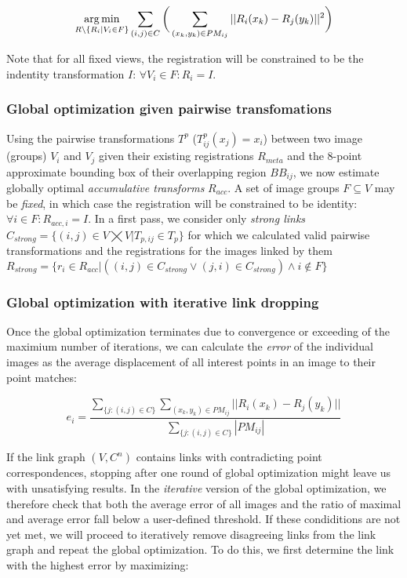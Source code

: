 \begin{equation}
\label{eq:globalopt-eq1}
\operatorname*{arg\,min}_{R \setminus \{R_i | V_i \in F\}} \sum_{(i,j) \in C} \bigg( \sum_{(x_{k}, y_{k}) \in PM_{ij}} || R_{i}( x_{k}) - R_{j}( y_{k}) ||^2 \bigg)
\end{equation}

Note that for all fixed views, the registration will be constrained to be the indentity transformation $I$: $\forall V_i \in F: R_{i} = I$.

\subsubsection{Global optimization given pairwise transfomations}

Using the pairwise transformations $T^{p}$ ($T^p_{ij} (x_{j}) = x_i$) between two image (groups) $V_i$ and $V_j$ given their existing registrations $R_{meta}$ and the 8-point approximate bounding box of their overlapping region $BB_{ij}$, we now estimate globally optimal \emph{accumulative transforms} $R_{acc}$. A set of image groups $F \subseteq V$ may be \emph{fixed}, in which case the registration will be constrained to be identity: $\forall i \in F: R_{acc,i} = I$. In a first pass, we consider only \emph{strong links} $C_{strong} = \{(i,j) \in V \bigtimes V | T_{p, ij} \in T_p \}$ for which we calculated valid pairwise transformations and the registrations for the images linked by them $R_{strong} = \{r_i \in R_{acc} | ((i,j) \in C_{strong} \vee (j,i) \in C_{strong}) \wedge i \notin F\}$

\subsubsection{Global optimization with iterative link dropping}

Once the global optimization terminates due to convergence or exceeding of the maximium number of iterations, we can calculate the \emph{error} of the individual images as the average displacement of all interest points in an image to their point matches:

\begin{equation}
\label{eq:gloablopt-eq2}
e_i = \frac{\sum_{\{j: (i,j) \in C\}}  \sum_{(x_{k}, y_{k}) \in PM_{ij}} || R_{i}( x_{k}) - R_{j}( y_{k}) ||  }{ \sum_{\{j: (i,j) \in C\}} |PM_{ij}| }
\end{equation}

If the link graph $(V,C^n)$ contains links with contradicting point correspondences, stopping after one round of global optimization might leave us with unsatisfying results. In the \emph{iterative} version of the global optimization, we therefore check that both the average error of all images and the ratio of maximal and average error fall below a user-defined threshold. If these condiditions are not yet met, we will proceed to iteratively remove disagreeing links from the link graph and repeat the global optimization. To do this, we first determine the link with the highest error by maximizing:

